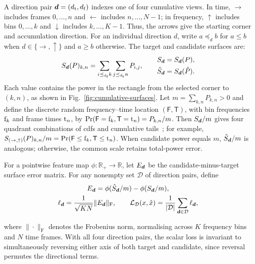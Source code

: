 \documentclass[letterpaper]{article}
\begin{document}
A direction pair $\boldsymbol{d}=(d_\mathrm{t}, d_\mathrm{f})$ indexes one of four cumulative views. In time,
$\rightarrow$ includes frames $0,\ldots,n$ and $\leftarrow$ includes
$n,\ldots,N-1$; in frequency, $\uparrow$ includes bins $0,\ldots,k$ and
$\downarrow$ includes $k,\ldots,K-1$. Thus, the arrows give the starting corner
and accumulation direction. For an individual direction $d$, write
$a\preceq_d b$ for $a\leq b$ when $d\in\{\rightarrow,\uparrow\}$ and
$a\geq b$ otherwise. The target and candidate surfaces are:
\begin{equation*}
S_{\boldsymbol{d}}(P)_{k,n}=\sum_{i\preceq_{d_\mathrm{f}}k}\sum_{j\preceq_{d_\mathrm{t}}n}P_{i,j},
\qquad
\begin{gathered}
S_{\boldsymbol{d}}=S_{\boldsymbol{d}}(P),\\
\hat S_{\boldsymbol{d}}=S_{\boldsymbol{d}}(\hat P).
\end{gathered}
\end{equation*}
Each value contains the power in the rectangle from the selected corner to
$(k,n)$, as shown in Fig.~\ref{fig:cumulative-surfaces}. Let
$m=\sum_{k,n}P_{k,n}>0$ and define the discrete random frequency--time location
$(\mathsf F,\mathsf T)$, with bin frequencies $\mathrm{f}_k$ and frame times $\mathrm{t}_n$, by $\Pr(\mathsf F=\mathrm{f}_k,\mathsf T=\mathrm{t}_n)=P_{k,n}/m$.
Then $S_{\boldsymbol{d}}/m$ gives four quadrant combinations of \glspl{cdf} and cumulative
tails~\cite{torres2024sot,peyre2019computational}; for example,
$S_{(\rightarrow,\uparrow)}(P)_{k,n}/m
=\Pr(\mathsf F\leq \mathrm{f}_k,\mathsf T\leq \mathrm{t}_n)$. When candidate power equals $m$,
$\hat S_{\boldsymbol{d}}/m$ is analogous; otherwise, the common scale retains total-power
error.

For a pointwise feature map $\phi:\mathbb R_+\rightarrow\mathbb R$, let
$E_{\boldsymbol{d}}$ be the candidate-minus-target surface error matrix. For any nonempty set
$\mathcal D$ of direction pairs, define
\begin{gather*}
E_{\boldsymbol{d}} = \phi(\hat S_{\boldsymbol{d}}/m)-\phi(S_{\boldsymbol{d}}/m),\\
\ell_{\boldsymbol{d}} = \frac{1}{\sqrt{KN}} \|E_{\boldsymbol{d}}\|_\mathrm{F}, \qquad
\mathcal L_{\mathcal D}(x,\hat x) = \frac1{|\mathcal D|}\sum_{\boldsymbol{d}\in\mathcal D}\ell_{\boldsymbol{d}},
\end{gather*}

where $\|\cdot\|_\mathrm{F}$ denotes the Frobenius norm, normalising across $K$ frequency bins and $N$ time frames. With all four direction pairs, the scalar loss is invariant to simultaneously reversing either axis of both target and candidate, since reversal permutes the directional terms.
\end{document}
